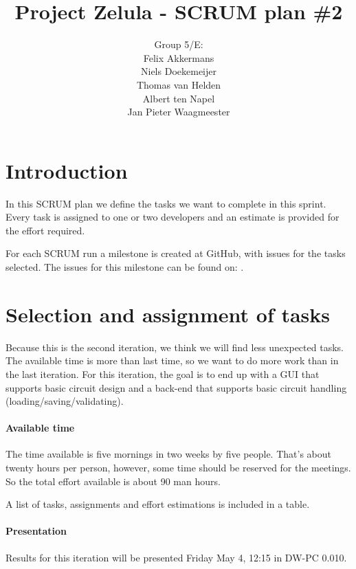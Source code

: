 \documentclass[a4paper]{article}
\title{Project Zelula - SCRUM plan \#2}
\author{Group 5/E:\\
Felix Akkermans \\
Niels Doekemeijer \\
Thomas van Helden \\
Albert ten Napel \\
Jan Pieter Waagmeester}
\begin{document}
\maketitle

\section{Introduction}
In this SCRUM plan we define the tasks we want to complete in this sprint. Every task is assigned to one or two developers and an estimate is provided for the effort required.

For each SCRUM run a milestone is created at GitHub, with issues for the tasks selected. The issues for this milestone can be found on: .

\section{Selection and assignment of tasks}
Because this is the second iteration, we think we will find less unexpected tasks. The available time is more than last time, so we want to do more work than in the last iteration. For this iteration, the goal is to end up with a GUI that supports basic circuit design and a back-end that supports basic circuit handling (loading/saving/validating).

\paragraph{Available time}
The time available is five mornings in two weeks by five people. That's about twenty hours per person, however, some time should be reserved for the meetings. So the total effort available is about 90 man hours.

A list of tasks, assignments and effort estimations is included in a table.


\paragraph{Presentation}
Results for this iteration will be presented Friday May 4, 12:15 in DW-PC 0.010.
\end{document}
